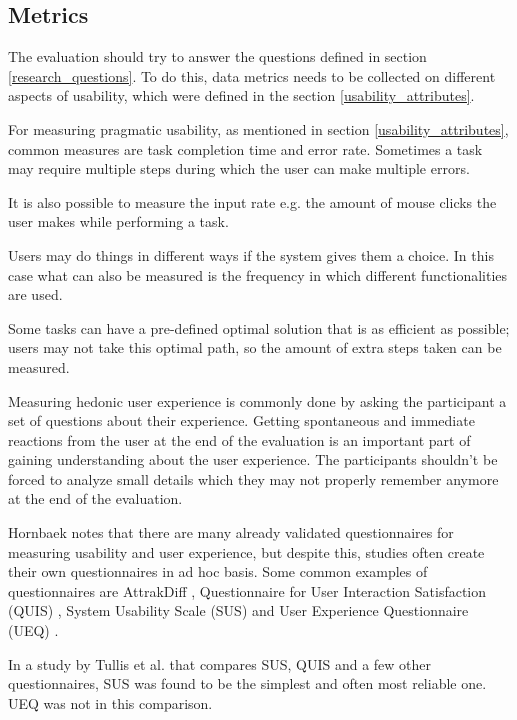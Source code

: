 \subsection{Metrics}
The evaluation should try to answer the questions defined in section \ref{research_questions}. To do this, data metrics needs to be collected on different aspects of usability, which were defined in the section \ref{usability_attributes}.

For measuring pragmatic usability, as mentioned in section \ref{usability_attributes}, common measures are task completion time and error rate. Sometimes a task may require multiple steps during which the user can make multiple errors. 

It is also possible to measure the input rate e.g. the amount of mouse clicks the user makes while performing a task.

Users may do things in different ways if the system gives them a choice. In this case what can also be measured is the frequency in which different functionalities are used. 

Some tasks can have a pre-defined optimal solution that is as efficient as possible; users may not take this optimal path, so the amount of extra steps taken can be measured. \cite{hornbaek2006current}

Measuring hedonic user experience is commonly done by asking the participant a set of questions about their experience. Getting spontaneous and immediate reactions from the user at the end of the evaluation is an important part of gaining understanding about the user experience. The participants shouldn't be forced to analyze small details which they may not properly remember anymore at the end of the evaluation. \cite{laugwitz2008construction}

Hornbaek notes that there are many already validated questionnaires for measuring usability and user experience, but despite this, studies often create their own questionnaires in ad hoc basis. \cite{hornbaek2006current} Some common examples of questionnaires are AttrakDiff \cite{hassenzahl2003attrakdiff}, Questionnaire for User Interaction Satisfaction (QUIS) \cite{chin1988questionnaire}, System Usability Scale (SUS) \cite{brooke1996sus} and User Experience Questionnaire (UEQ) \cite{laugwitz2008construction}.

In a study by Tullis et al. that compares SUS, QUIS and a few other questionnaires, SUS was found to be the simplest and often most reliable one. UEQ was not in this comparison. \cite{tullis2004comparison}


